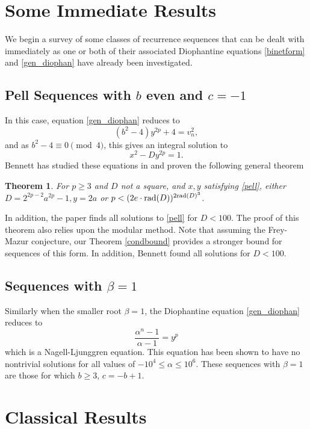 \documentclass[12pt]{amsart}
\newtheorem{thm}{Theorem}[section]
\theoremstyle{definition}
\newcommand{\rad}{{\rm{rad}}}
\begin{document}
\section{Some Immediate Results}

We begin a survey of some classes of recurrence sequences that can be dealt with immediately as one or both of their associated Diophantine equations \ref{binetform} and \ref{gen_diophan} have already been investigated.

\subsection{Pell Sequences with $b$ even and $c = -1$}

In this case, equation \ref{gen_diophan} reduces to
\[ (b^2-4)y^{2p}+4 = v_n^2, \]
and as $b^2-4 \equiv 0 \pmod{4}$, this gives an integral solution to 
\begin{equation}\label{pell} x^2 - Dy^{2p} = 1.\end{equation}
Bennett has studied these equations in \cite{bennett05} and proven the following general theorem
\begin{thm}
For $p \geq 3$ and $D$ not a square, and $x,y$ satisfying \ref{pell}, either $D = 2^{2p-2}a^{2p}-1, y = 2a$ or $p < (2e\cdot \rad(D))^{2\rad(D)^3}$.
\end{thm}
In addition, the paper finds all solutions to \ref{pell} for $D< 100$.  The proof of this theorem also relies upon the modular method.  Note that assuming the Frey-Mazur conjecture, our Theorem \ref{condbound} provides a stronger bound for sequences of this form.  In addition, Bennett found all solutions for $D< 100$.

\subsection{Sequences with $\beta = 1$}

Similarly when the smaller root $\beta=1$, the Diophantine equation \ref{gen_diophan} reduces to 
\[ \frac{\alpha^n - 1}{\alpha - 1} = y^p \]
which is a Nagell-Ljunggren equation.  This equation has been shown to have no nontrivial solutions for all values of $-10^4 \leq \alpha \leq 10^6$.  These sequences with $\beta = 1$ are those for which $b \geq 3$, $c = -b+1$.  


\section{Classical Results}
\end{document}
